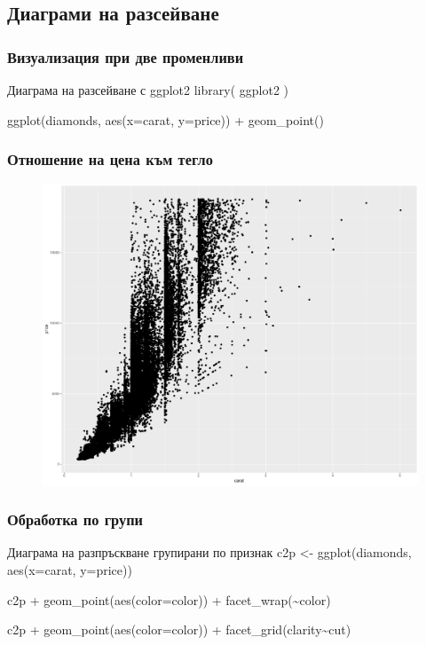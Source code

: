 \documentclass{beamer}
\begin{document}
\subsection{Диаграми на разсейване}

\begin{frame}
\frametitle{Визуализация при две променливи}
\begin{block}{Диаграма на разсейване с ggplot2}
library( ggplot2 )

ggplot(diamonds, aes(x=carat, y=price)) + geom\_point()
\end{block}
\end{frame}

\begin{frame}
\frametitle{Отношение на цена към тегло}
\begin{figure}[]\includegraphics[width=\textwidth,height=0.75\textheight]{pic0033}\end{figure}
\end{frame}

\begin{frame}
\frametitle{Обработка по групи}
\begin{block}{Диаграма на разпръскване групирани по признак}
c2p <- ggplot(diamonds, aes(x=carat, y=price))

c2p + geom\_point(aes(color=color)) + facet\_wrap(\textasciitilde color)

c2p + geom\_point(aes(color=color)) + facet\_grid(clarity\textasciitilde cut)
\end{block}
\end{frame}
\end{document}
